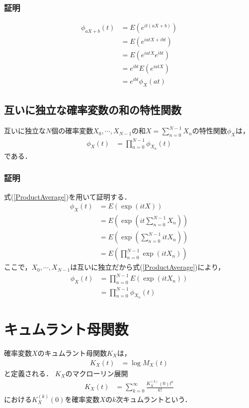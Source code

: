 \documentclass[dvipdfmx]{jsarticle}
\begin{document}
 \subsubsection{証明}
 \begin{align}
  \phi_{aX+b}\left(t\right)&=E\left(e^{it\left(aX+b\right)}\right)\nonumber\\
  &=E\left(e^{iatX+ibt}\right)\nonumber\\
  &=E\left(e^{iatX}e^{ibt}\right)\nonumber\\
  &=e^{ibt}E\left(e^{iatX}\right)\nonumber\\
  &=e^{ibt}\phi_{X}\left(at\right)
 \end{align}
 \subsection{互いに独立な確率変数の和の特性関数}
互いに独立な$N$個の確率変数$X_0,\cdots,X_{N-1}$の和$X=\sum_{n=0}^{N-1}X_n$の特性関数$\phi_X$は，
 \begin{align}
  \phi_X\left(t\right)&=\prod_{n=0}^{N-1}\phi_{X_n}\left(t\right)
 \end{align}
である．
 \subsubsection{証明}
式(\ref{ProductAverage})を用いて証明する．
 \begin{align}
  \phi_X\left(t\right)&=E\left(\exp\left(itX\right)\right)\nonumber\\
  &=E\left(\exp\left(it\sum_{n=0}^{N-1}X_n\right)\right)\nonumber\\
  &=E\left(\exp\left(\sum_{n=0}^{N-1}itX_n\right)\right)\nonumber\\
  &=E\left(\prod_{n=0}^{N-1}\exp\left(itX_n\right)\right)\nonumber
 \end{align}
ここで，$X_0,\cdots,X_{N-1}$は互いに独立だから式(\ref{ProductAverage})により，
 \begin{align}
  \phi_X\left(t\right)&=\prod_{n=0}^{N-1}E\left(\exp\left(itX_n\right)\right)\nonumber\\
  &=\prod_{n=0}^{N-1}\phi_{X_n}\left(t\right)
 \end{align}
 \section{キュムラント母関数}
確率変数$X$のキュムラント母関数$K_X$は，
 \begin{align}
  K_X\left(t\right)&=\log M_X\left(t\right)
 \end{align}
と定義される．
$K_X$のマクローリン展開
 \begin{align}
  K_X\left(t\right)&=\sum_{k=0}^\infty \frac{K_X^{\left(k\right)}\left(0\right)t^k}{k!}
 \end{align}
における$K_X^{\left(k\right)}\left(0\right)$を確率変数$X$の$k$次キュムラントという．
\end{document}
